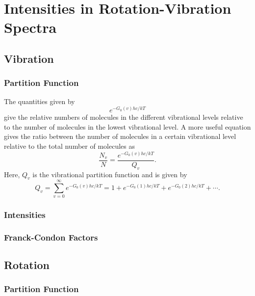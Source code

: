 \chapter{Intensities in Rotation-Vibration Spectra}
\label{c:intensities_in_rotation-vibration_spectra}

\section{Vibration}
\label{s:vibration}

\subsection{Partition Function}

The quantities given by
\begin{equation*}
    e^{-G_{0}(v)hc/kT}
\end{equation*}
give the relative numbers of molecules in the different vibrational levels relative to the number of molecules in the lowest vibrational level. A more useful equation gives the ratio between the number of molecules in a certain vibrational level relative to the total number of molecules as
\begin{equation*}
    \frac{N_{v}}{N} = \frac{e^{-G_{0}(v)hc / kT}}{Q_{v}}.
\end{equation*}
Here, $Q_{v}$ is the vibrational partition function and is given by
\begin{equation*}
    Q_{v} = \sum_{v=0}^{\infty}e^{-G_{0}(v)hc / kT} = 1 + e^{-G_{0}(1)hc / kT} + e^{-G_{0}(2)hc / kT} + \dotsb.
\end{equation*}

\subsection{Intensities}

\subsection{Franck-Condon Factors}

\section{Rotation}
\label{s:rotation}

\subsection{Partition Function}

